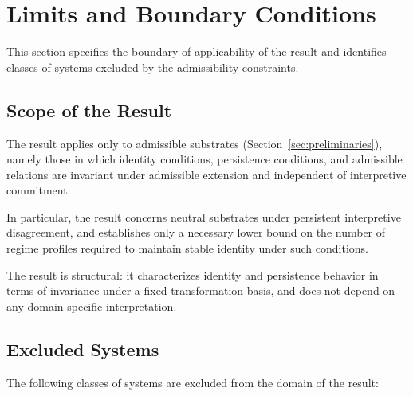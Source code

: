 
\section{Limits and Boundary Conditions}
\label{sec:limits}

This section specifies the boundary of applicability of the
result and identifies classes of systems
excluded by the admissibility constraints.

\subsection{Scope of the Result}
\label{subsec:limits_scope}

The result applies only to admissible substrates
(Section~\ref{sec:preliminaries}),
namely those in which identity conditions, persistence conditions,
and admissible relations are invariant under admissible extension
and independent of interpretive commitment.

In particular, the result concerns neutral substrates under
persistent interpretive disagreement, and establishes only a
necessary lower bound on the number of regime profiles required
to maintain stable identity under such conditions.

The result is structural:
it characterizes identity and persistence behavior
in terms of invariance under a fixed transformation basis,
and does not depend on any domain-specific interpretation.

\subsection{Excluded Systems}
\label{subsec:limits_excluded}

The following classes of systems are excluded from the domain of the result:

